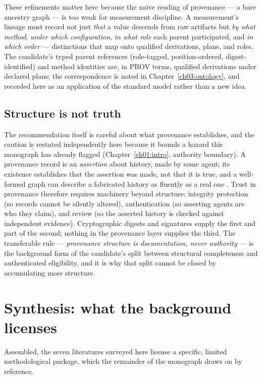 These refinements matter here because the naive reading of provenance --- a bare ancestry graph --- is too weak for measurement discipline. A measurement's lineage must record not just \emph{that} a value descends from raw artifacts but \emph{by what method}, \emph{under which configuration}, \emph{in what role} each parent participated, and \emph{in which order} --- distinctions that map onto qualified derivations, plans, and roles. The candidate's typed parent references (role-tagged, position-ordered, digest-identified) and method identities are, in PROV terms, qualified derivations under declared plans; the correspondence is noted in Chapter~\ref{ch03:ontology}, and recorded here as an application of the standard model rather than a new idea.

\subsection{Structure is not truth}\label{ch02:prov:truth}

The recommendation itself is careful about what provenance establishes, and the caution is restated independently here because it bounds a hazard this monograph has already flagged (Chapter~\ref{ch01:intro}, authority boundary). A provenance record is an \emph{assertion} about history, made by some agent; its existence establishes that the assertion was made, not that it is true, and a well-formed graph can describe a fabricated history as fluently as a real one \cite{prov}. Trust in provenance therefore requires machinery beyond structure: integrity protection (so records cannot be silently altered), authentication (so asserting agents are who they claim), and review (so the asserted history is checked against independent evidence). Cryptographic digests and signatures supply the first and part of the second; nothing in the provenance layer supplies the third. The transferable rule --- \emph{provenance structure is documentation, never authority} --- is the background form of the candidate's split between structural completeness and authenticated eligibility, and it is why that split cannot be closed by accumulating more structure.

\section{Synthesis: what the background licenses}\label{ch02:synthesis}

Assembled, the seven literatures surveyed here license a specific, limited methodological package, which the remainder of the monograph draws on by reference.

